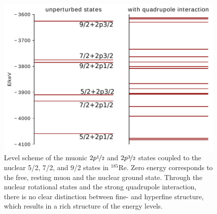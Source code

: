 \begin{figure}%
\centering
\includegraphics[width=0.88\linewidth]{pics/quad2.pdf}%
\caption{Level scheme of the muonic $2p\nicefrac{1}{2}$ and $2p\nicefrac{3}{2}$ states coupled to the nuclear 5/2, 7/2, and 9/2  states in $^{185}$Re. Zero energy corresponds to the free, resting muon and the nuclear ground state. Through the nuclear rotational states and the strong quadrupole interaction, there is no clear distinction between fine- and hyperfine structure, which results in a rich structure of the energy levels.}%
\label{fig:quad2}%
\end{figure}
%


